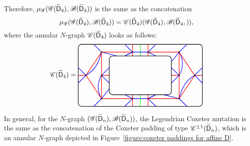 Therefore, $\mu_\mathscr{G}(\mathscr{G}(\widetilde{\mathsf{D}}_4), \mathscr{B}(\widetilde{\mathsf{D}}_4))$ is the same as the concatenation 
\[
\mu_\mathscr{G}(\mathscr{G}(\widetilde{\mathsf{D}}_4), \mathscr{B}(\widetilde{\mathsf{D}}_4))=\mathscr{C}(\widetilde{\mathsf{D}}_4)(\mathscr{G}(\widetilde{\mathsf{D}}_4),\mathscr{B}(\widetilde{\mathsf{D}}_4,)),
\]
where the annular $N$-graph $\mathscr{C}(\widetilde{\mathsf{D}}_4)$ looks as follows:
\[
\coxeterpadding(\exdynD_4)=
\begin{tikzpicture}[baseline=-.5ex,scale=0.4]
\draw[rounded corners=5, thick] (-8, -4) rectangle (8, 4);
\clip[rounded corners=5] (-8, -4) rectangle (8, 4);
\foreach \r in {0, 180} {
\begin{scope}[rotate=\r]
\draw[blue, thick]
(-4, 1) -- ++(-1, -1)
(-4, -1) -- ++(-1, 1) to[out=-120, in=120] ++(0,-3)
(-5, 3) to[out=-105,in=30] (-7,0)
%
(-2, -2.5) -- ++(1, -0.5) -- +(-1, -1)
++(0,0) -- ++(2, 0) -- ++(1, 0.5)
(-4, -1.75) -- ++(-1, -1.25) -- ++(-1, -1)
(-3, 2.5) -- ++(-2, 0.5) -- ++(-1, 1)
(-2, 2.5) -- ++(1, 0.5) -- ++(-1, 1)
(-8, 1) -- ++(1, -1) -- ++(-1, -1)
;
\draw[red, thick] 
(-1, -2.5) -- ++(0, -0.5) -- +(0, -1)
++(0,0) -- ++(-4, 0) -- ++(0, 3) -- +(1,0)
++(0,0) -- ++(0,3) -- ++(4,0) -- +(0, 1)
++(0,0) -- ++(0, -0.5)
(-5, -3) -- ++(-2, 3) -- +(-1, 0)
++(0,0) -- ++(2, 3)
;
\draw[green, thick] (0, 4) -- (0, 2.5);
\draw[fill=white, thick] 
(-5, 0) circle (2pt) (-7, 0) circle (2pt)
(-5, -3) circle (2pt) (-1, -3) circle (2pt) (1, -3) circle (2pt)
(-5, 3) circle (2pt)
;
\end{scope}
}
\draw[rounded corners=5, thick] (-4, -2.5) rectangle (4, 2.5);
\end{tikzpicture}
\]

In general, for the $N$-graph $(\mathscr{G}(\widetilde{\mathsf{D}}_n), \mathscr{B}(\widetilde{\mathsf{D}}_n))$, the Legendrian Coxeter mutation is the same as the concatenation of the Coxeter padding of type $\mathscr{C}^{\pm1}(\widetilde{\mathsf{D}}_n)$, which is an annular $N$-graph depicted in Figure~\ref{figure:coxeter paddings for affine D}.


